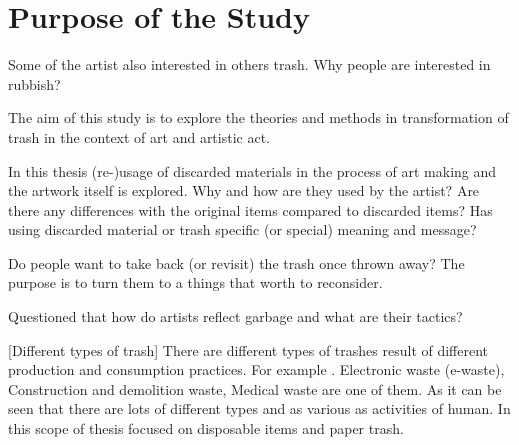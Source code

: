 %
\section{Purpose of the Study}

Some of the artist also interested in others trash. Why people are interested in rubbish?


The aim of this study is to explore the theories and methods in transformation of trash in the context of art and artistic act.

In this thesis (re-)usage of discarded materials in the process of art making and the artwork itself is explored. Why and how are they used by the artist? Are there any differences with the original items compared to discarded items? Has using discarded material or trash specific (or special) meaning and message? 

 


Do people want to take back (or revisit) the trash once thrown away? The purpose is to turn them to a things that worth to reconsider. 

Questioned that how do artists reflect garbage and what are their tactics?





%
%
[Different types of trash] There are different types of trashes result of different production and consumption practices. For example . Electronic waste (e-waste), Construction and demolition waste, Medical waste are one of them. As it can be seen that there are lots of different types and as various as activities of human. In this scope of thesis focused on disposable items and paper trash.





